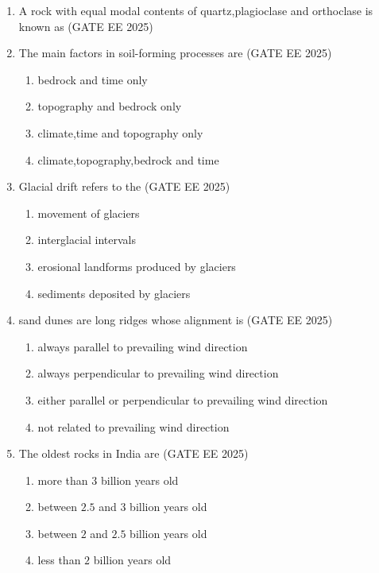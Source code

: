 \documentclass[journal]{IEEEtran}
\begin{document}
\begin{enumerate}[start=1]
\item A rock with equal modal contents of quartz,plagioclase and orthoclase is known as
\hfill{(GATE EE 2025)}
\begin{enumerate}
\end{enumerate}


\item   The main factors in soil-forming processes are
\hfill{(GATE EE 2025)}
\begin{enumerate}
\item bedrock and time only
\item topography and bedrock only
\item climate,time and topography only
\item climate,topography,bedrock and time
\end{enumerate}


\item  Glacial drift refers to the
\hfill{(GATE EE 2025)}
\begin{enumerate}
\item movement of glaciers
\item interglacial intervals
\item erosional landforms produced by glaciers
\item sediments deposited by glaciers
\end{enumerate}


\item  sand dunes are long ridges whose alignment is
\hfill{(GATE EE 2025)}
\begin{enumerate}
\item always parallel to prevailing wind direction
\item always perpendicular to prevailing wind direction
\item either parallel or perpendicular to prevailing wind direction
\item not related  to prevailing wind direction
\end{enumerate}


\item  The oldest rocks in India are
\hfill{(GATE EE 2025)}
\begin{enumerate}
\item more than $3$ billion years old
\item between $2.5$ and $3$ billion years old
\item between $2$ and $2.5$ billion years old
\item less than $2$ billion years old
\end{enumerate}



\end{enumerate}
\end{document}
